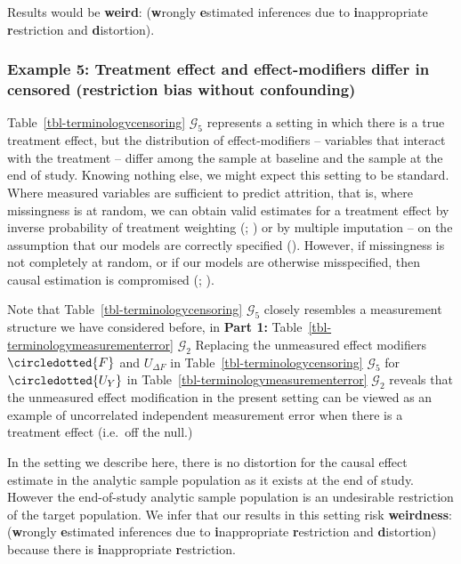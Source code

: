 \documentclass[
  single column]{article}
\begin{document}
Results would be \textbf{weird}: (\textbf{w}rongly \textbf{e}stimated
inferences due to \textbf{i}nappropriate \textbf{r}estriction and
\textbf{d}istortion).

\subsubsection{Example 5: Treatment effect and effect-modifiers differ
in censored (restriction bias without
confounding)}\label{example-5-treatment-effect-and-effect-modifiers-differ-in-censored-restriction-bias-without-confounding}

Table~\ref{tbl-terminologycensoring} \(\mathcal{G}_5\) represents a
setting in which there is a true treatment effect, but the distribution
of effect-modifiers -- variables that interact with the treatment --
differ among the sample at baseline and the sample at the end of study.
Knowing nothing else, we might expect this setting to be standard. Where
measured variables are sufficient to predict attrition, that is, where
missingness is at random, we can obtain valid estimates for a treatment
effect by inverse probability of treatment weighting
(;
) or by multiple
imputation -- on the assumption that our models are correctly specified
(). However, if
missingness is not completely at random, or if our models are otherwise
misspecified, then causal estimation is compromised
(;
).

Note that Table~\ref{tbl-terminologycensoring} \(\mathcal{G}_5\) closely
resembles a measurement structure we have considered before, in
\textbf{Part 1:} Table~\ref{tbl-terminologymeasurementerror}
\(\mathcal{G}_2\) Replacing the unmeasured effect modifiers
\(\circledotted{F}\) and \(U_{\Delta F}\) in
Table~\ref{tbl-terminologycensoring} \(\mathcal{G}_5\) for
\(\circledotted{U_Y}\) in Table~\ref{tbl-terminologymeasurementerror}
\(\mathcal{G}_2\) reveals that the unmeasured effect modification in the
present setting can be viewed as an example of uncorrelated independent
measurement error when there is a treatment effect (i.e.~off the null.)

In the setting we describe here, there is no distortion for the causal
effect estimate in the analytic sample population as it exists at the
end of study. However the end-of-study analytic sample population is an
undesirable restriction of the target population. We infer that our
results in this setting risk \textbf{weirdness}: (\textbf{w}rongly
\textbf{e}stimated inferences due to \textbf{i}nappropriate
\textbf{r}estriction and \textbf{d}istortion) because there is
\textbf{i}nappropriate \textbf{r}estriction.
\end{document}

